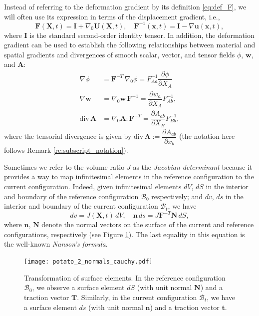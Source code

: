\documentclass{sfuthesis}
\numberwithin{equation}{section}
\numberwithin{figure}{chapter}
\numberwithin{table}{chapter}
\theoremstyle{definition}
\def\*#1{{\mathbf{#1}}} %
\newcommand{\pder}[2]{\dfrac{\partial #1}{\partial #2}}
\newcommand{\divt}[1]{{\bm{\mathrm{div}} \, #1}}
\newcommand{\B}{\mathcal{B}}
\begin{document}
Instead of referring to the deformation gradient by its definition \eqref{eq:def_F}, we will often use its expression in terms of the displacement gradient, i.e.,
\begin{equation} \label{eq:real_def_of_F}
\*F(\*X,t) = \*I + \nabla_0 \*U(\*X,t) , \quad \*F^{-1}(\*x,t) = \*I - \nabla \*u(\*x,t),
\end{equation}
where $\*I$ is the standard second-order identity tensor. In addition, the deformation gradient can be used to establish the following relationships between material and spatial gradients and divergences of smooth scalar, vector, and tensor fields $\phi$, $\*w$, and $\*A$:
\begin{align}
\nabla \phi &= \*F^{-T} \, \nabla_0 \phi = F^{-1}_{Aa} \pder{\phi}{X_A} \\
\label{eq:transform_2}\nabla \*w &= \nabla_0 \*w \, \*F^{-1} = \pder{w_a}{X_A} F^{-1}_{Ab}, \\
\label{eq:transform_3}\divt{\*A} &= \nabla_0 \*A : \*F^{-T} = \pder{A_{ab}}{X_B} F^{-1}_{Bb},
\end{align}
where the tensorial divergence is given by $\divt{\*A} := \pder{A_{ab}}{x_b}$ (the notation here follows Remark \ref{re:subscript_notation}).

Sometimes we refer to the volume ratio $J$ as the \textit{Jacobian determinant} because it provides a way to map infinitesimal elements in the reference configuration to the current configuration. Indeed, given infinitesimal elements $dV$, $dS$ in the interior and boundary of the reference configuration $\B_0$ respectively; and $dv$, $ds$ in the interior and boundary of the current configuration $\B_t$, we have 
\begin{equation} \label{eq:differentials}
dv = J(\*X,t) \, dV, \quad \*n \, ds = J \*F^{-T} \*N \, dS, 
\end{equation}
where $\*n$, $\*N$ denote the normal vectors on the surface of the current and reference configurations, respectively (see Figure \ref{fig:potato_dv_ds}). The last equality in this equation is the well-known \textit{Nanson's formula}.

\begin{figure}
    \centering
    \texttt{[image: potato\_2\_normals\_cauchy.pdf]}
    \caption{Transformation of surface elements. In the reference configuration $\B_0$, we observe a surface element $dS$ (with unit normal $\*N$) and a traction vector $\*T$. Similarly, in the current configuration $\B_t$, we have a surface element $ds$ (with unit normal $\*n$) and a traction vector $\*t$.
    \label{fig:potato_dv_ds}}
\end{figure}
\end{document}
